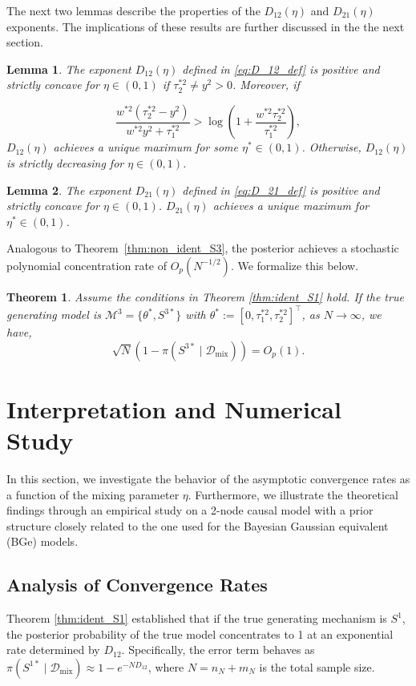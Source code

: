\documentclass[accepted]{uai2026} %
\newcommand{\train}{\mathcal{D}}
\newcommand{\mixdata}{\train_{\text{mix}}}
\newcommand{\tsone}{\tau_1^{*2}}
\newcommand{\tstwo}{\tau_2^{*2}}
\def\transpose{\intercal}
\newtheorem{lemma}{Lemma}[section]
\theoremstyle{boldremark}
\newtheorem{theorem}{Theorem}[section]
\begin{document}
The next two lemmas describe the properties of the $D_{12}(\eta)$ and $D_{21}(\eta)$ exponents. The implications of these results are further discussed in the the next section.

\begin{lemma}
\label{lemma:concavity_D_12}
The exponent $D_{12}(\eta)$ defined in \eqref{eq:D_12_def} is positive and strictly concave for $\eta \in (0,1)$ if $\tstwo \neq y^2 >0$. Moreover, if 

\begin{equation}
    \label{eq:cond_D_12}
    \frac{w^{*2}(\tstwo-y^2)}{w^{*2}y^2+\tsone} > \log \left( 1+\frac{w^{*2}\tstwo}{\tsone} \right),
\end{equation}
$D_{12}(\eta)$ achieves a \textit{unique} maximum for some $\eta^* \in (0,1)$. Otherwise, $D_{12}(\eta)$ is strictly decreasing for $\eta \in (0,1)$.
\end{lemma}

\begin{lemma}
    \label{lemma:D_21_concavity}
    The exponent $D_{21}(\eta)$ defined in \eqref{eq:D_21_def} is positive and strictly concave for $\eta \in (0,1)$. $D_{21}(\eta)$ achieves a unique maximum for $\eta^* \in (0,1)$.
\end{lemma}

Analogous to Theorem~\ref{thm:non_ident_S3}, the posterior achieves a stochastic polynomial concentration rate of $O_p(N^{-1/2})$. We formalize this below.

\begin{theorem}
\label{thm:ident_S3}
    Assume the conditions in Theorem \ref{thm:ident_S1} hold. If the true generating model is $\mathcal{M}^3 = \{\theta^*, S^{3*}\}$ with $\theta^*:= [0, \tsone, \tstwo]^\transpose$, as $N \to \infty$, we have,
    $$\sqrt{N}(1-\pi(S^{3*}\mid \mixdata)) = O_p(1).$$
\end{theorem}


\section{Interpretation and Numerical Study}
\label{sec:interpretation}
In this section, we investigate the behavior of the asymptotic convergence rates as a function of the mixing parameter $\eta$. Furthermore, we illustrate the theoretical findings through an empirical study on a 2-node causal model with a prior structure closely related to the one used for the Bayesian Gaussian equivalent (BGe) models.

\subsection{Analysis of Convergence Rates}
\label{subsec:numerical_analysis_conv_rates}
Theorem \ref{thm:ident_S1} established that if the true generating mechanism is $S^1$, the posterior probability of the true model concentrates to 1 at an exponential rate determined by $D_{12}$. Specifically, the error term behaves as $\pi(S^{1*} \mid \mixdata) \approx 1 - e^{-N D_{12}}$, where $N = n_N + m_N$ is the total sample size.
\end{document}
